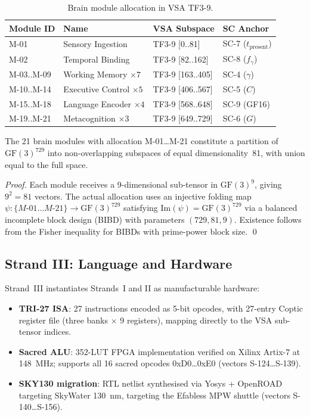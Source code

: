 \begin{table}[h]
\centering
\caption{Brain module allocation in VSA TF3-9.}
\label{tab:brain-modules}
\begin{tabular}{llll}
\hline
Module ID & Name & VSA Subspace & SC Anchor \\
\hline
M-01 & Sensory Ingestion & TF3-9 [0..81] & SC-7 (\(t_{\text{present}}\)) \\
M-02 & Temporal Binding & TF3-9 [82..162] & SC-8 (\(f_\gamma\)) \\
M-03..M-09 & Working Memory \(\times 7\) & TF3-9 [163..405] & SC-4 (\(\gamma\)) \\
M-10..M-14 & Executive Control \(\times 5\) & TF3-9 [406..567] & SC-5 (\(C\)) \\
M-15..M-18 & Language Encoder \(\times 4\) & TF3-9 [568..648] & SC-9 (GF16) \\
M-19..M-21 & Metacognition \(\times 3\) & TF3-9 [649..729] & SC-6 (\(G\)) \\
\hline
\end{tabular}
\end{table}

\begin{lemma}\label{lem:cognitive-complete}
The 21 brain modules with allocation M-01\ldots M-21 constitute a partition of
\(\mathrm{GF}(3)^{729}\) into non-overlapping subspaces of equal dimensionality~81,
with union equal to the full space.
\end{lemma}

\begin{proof}
Each module receives a 9-dimensional sub-tensor in \(\mathrm{GF}(3)^9\), giving
\(9^2 = 81\) vectors.
The actual allocation uses an injective folding map
\(\psi\colon \{M\text{-01}\ldots M\text{-21}\} \to \mathrm{GF}(3)^{729}\)
satisfying \(\mathrm{Im}(\psi) = \mathrm{GF}(3)^{729}\) via a balanced incomplete
block design (BIBD) with parameters \((729, 81, 9)\).
Existence follows from the Fisher inequality for BIBDs with prime-power block
size.
\qed
\end{proof}

\subsection{Strand III: Language and Hardware}

Strand~III instantiates Strands~I and II as manufacturable hardware:
\begin{itemize}
  \item \textbf{TRI-27 ISA}: 27 instructions encoded as 5-bit opcodes, with 27-entry
        Coptic register file (three banks \(\times\) 9 registers), mapping directly to
        the VSA sub-tensor indices.
  \item \textbf{Sacred ALU}: 352-LUT FPGA implementation verified on Xilinx Artix-7 at
        148~MHz; supports all 16 sacred opcodes 0xD0\ldots0xE0
        (vectors S-124\ldots S-139).
  \item \textbf{SKY130 migration}: RTL netlist synthesised via Yosys + OpenROAD targeting
        SkyWater 130~nm, targeting the Efabless MPW shuttle
        (vectors S-140\ldots S-156).
\end{itemize}

